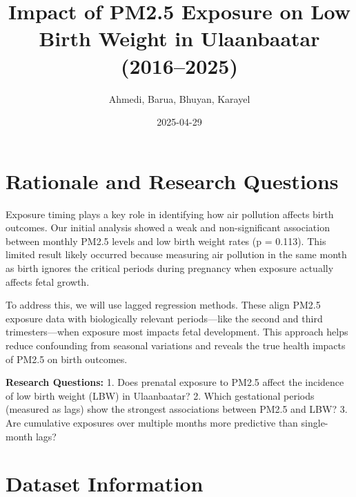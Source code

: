 \documentclass[
]{article}
\title{Impact of PM2.5 Exposure on Low Birth Weight in Ulaanbaatar
(2016--2025)}
\author{Ahmedi, Barua, Bhuyan, Karayel}
\date{2025-04-29}
\newenvironment{Shaded}{\begin{snugshade}}{\end{snugshade}}
\newcommand{\AttributeTok}[1]{\textcolor[rgb]{0.13,0.29,0.53}{#1}}
\newcommand{\FunctionTok}[1]{\textcolor[rgb]{0.13,0.29,0.53}{\textbf{#1}}}
\newcommand{\NormalTok}[1]{#1}
\newcommand{\SpecialCharTok}[1]{\textcolor[rgb]{0.81,0.36,0.00}{\textbf{#1}}}
\begin{document}
\maketitle

{
\setcounter{tocdepth}{2}
\tableofcontents
}
\begin{Shaded}
\end{Shaded}

\newpage
\listoftables
\newpage
\listoffigures
\newpage

\section{Rationale and Research
Questions}\label{rationale-and-research-questions}

Exposure timing plays a key role in identifying how air pollution
affects birth outcomes. Our initial analysis showed a weak and
non-significant association between monthly PM2.5 levels and low birth
weight rates (p = 0.113). This limited result likely occurred because
measuring air pollution in the same month as birth ignores the critical
periods during pregnancy when exposure actually affects fetal growth.

To address this, we will use lagged regression methods. These align
PM2.5 exposure data with biologically relevant periods---like the second
and third trimesters---when exposure most impacts fetal development.
This approach helps reduce confounding from seasonal variations and
reveals the true health impacts of PM2.5 on birth outcomes.

\textbf{Research Questions:} 1. Does prenatal exposure to PM2.5 affect
the incidence of low birth weight (LBW) in Ulaanbaatar? 2. Which
gestational periods (measured as lags) show the strongest associations
between PM2.5 and LBW? 3. Are cumulative exposures over multiple months
more predictive than single-month lags?

\newpage

\section{Dataset Information}\label{dataset-information}
\end{document}

